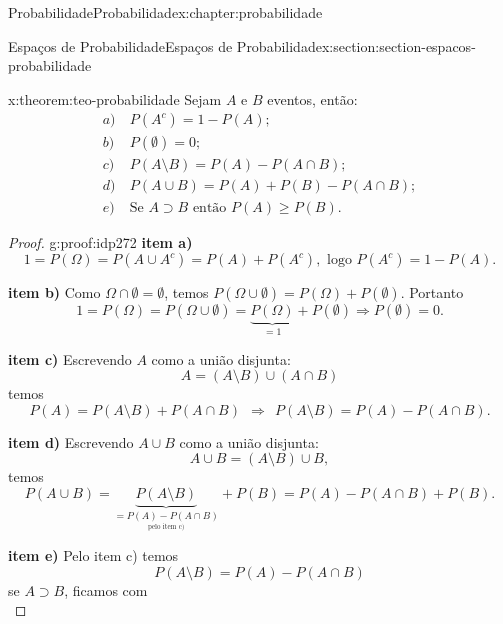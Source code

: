 \documentclass[oneside,10pt,]{book}
\newcommand{\terminology}[1]{\textbf{#1}}
\numberwithin{equation}{section}
\newcommand{\amp}{&}
\begin{document}
\begin{chapterptx}{Probabilidade}{}{Probabilidade}{}{}{x:chapter:probabilidade}
\begin{sectionptx}{Espaços de Probabilidade}{}{Espaços de Probabilidade}{}{}{x:section:section-espacos-probabilidade}
\begin{theorem}{}{}{x:theorem:teo-probabilidade}
Sejam \(A\) e \(B\) eventos, então:%
\begin{align*}
a) \amp ~  P(A^c) = 1 - P(A); \\
b) \amp ~ P(\emptyset)=0; \\
c) \amp ~ P(A\setminus B) = P(A) - P(A\cap B);  \\
d) \amp ~ P(A\cup B) = P(A)+P(B) - P(A\cap B);  \\
e) \amp ~ \text{Se } A\supset B \text{ então } P(A) \geq P(B).  
\end{align*}
%
\end{theorem}
\begin{proof}{}{g:proof:idp272}
\terminology{item a)}%
\begin{equation*}
1 = P(\Omega) = P(A\cup A^c) = P(A) + P(A^c), \text{ logo } P(A^c) = 1-P(A).
\end{equation*}
%
\par
\terminology{item b)} Como \(\Omega\cap \emptyset = \emptyset\), temos \(P(\Omega\cup \emptyset) = P(\Omega) + P(\emptyset)\). Portanto%
\begin{equation*}
1 = P(\Omega) = P(\Omega\cup \emptyset) = \underbrace{P(\Omega)}_{=1} + P(\emptyset)\Rightarrow P(\emptyset) = 0. 
\end{equation*}
%
\par
\terminology{item c)} Escrevendo \(A\) como a união disjunta:%
\begin{equation*}
A = (A\setminus B) \cup (A\cap B)
\end{equation*}
temos%
\begin{equation*}
P(A) =  P(A\setminus B) + P(A\cap B)~~ \Rightarrow ~~ P(A\setminus B) = P(A) - P(A\cap B). 
\end{equation*}
%
\par
\terminology{item d)} Escrevendo \(A\cup B\) como a união disjunta:%
\begin{equation*}
A\cup B = (A\setminus B)\cup B, 
\end{equation*}
temos%
\begin{equation*}
P(A\cup B) = \underbrace{P(A\setminus B)}_{\underset{\text{pelo item c)}}{= P(A) - P(A\cap B)}} + P(B) = P(A) - P(A\cap B) + P(B). 
\end{equation*}
%
\par
\terminology{item e)} Pelo item c) temos%
\begin{equation*}
P(A\setminus B) = P(A) - P(A\cap B)
\end{equation*}
se \(A\supset B\), ficamos com%
\begin{equation*}

\end{equation*}
\end{proof}
\end{sectionptx}
\end{chapterptx}
\end{document}
